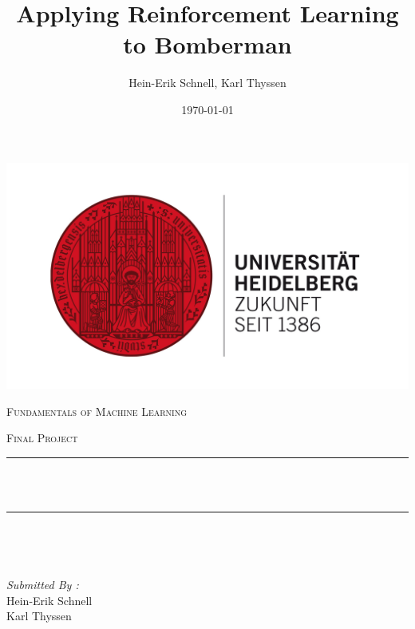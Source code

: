 \documentclass[12pt]{report}
\title{Applying Reinforcement Learning to Bomberman}
\author{Hein-Erik Schnell, Karl Thyssen}
\date{\today}
\makeatletter
\let\thetitle\@title
\makeatother
\begin{document}

\begin{titlepage}
	\centering
    \vspace*{0.5 cm}
    \includegraphics[scale = 0.075]{uni_hd_logo.jpg}\\[1.0 cm]	%
\begin{center}    \textsc{\Large   Fundamentals of Machine Learning}\\[2.0 cm]	\end{center}%
	\textsc{\Large Final Project  }\\[0.5 cm]				%
	\rule{\linewidth}{0.2 mm} \\[0.4 cm]
	{ \huge \bfseries \thetitle}\\
	\rule{\linewidth}{0.2 mm} \\[1.5 cm]
	
	\begin{minipage}{0.4\textwidth}
		\begin{flushleft} \large
			\end{flushleft}
			\end{minipage}~
			\begin{minipage}{0.4\textwidth}
            
			\begin{flushright} \large
			\emph{Submitted By :} \\
			Hein-Erik Schnell\\
			Karl Thyssen  
		\end{flushright}
           
	\end{minipage}\\[2 cm]
	
    
    
    
    
	
\end{titlepage}
\end{document}

